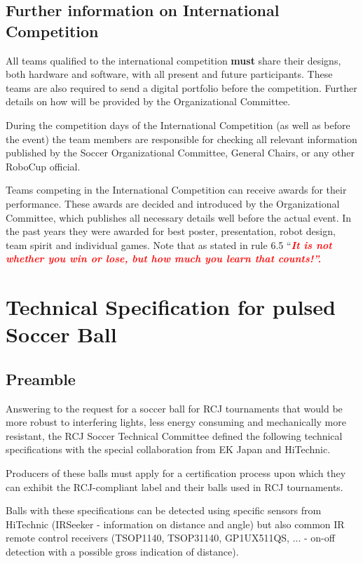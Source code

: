 \documentclass{article}
\begin{document}
\subsection{Further information on International Competition \label{ref-061}}

All teams qualified to the international competition \textbf{must} share their
designs, both hardware and software, with all present and future participants.
These teams are also required to send a digital portfolio before the
competition. Further details on how will be provided by the Organizational
Committee.

During the competition days of the International Competition (as well as before
the event) the team members are responsible for checking all relevant
information published by the Soccer Organizational Committee, General Chairs,
or any other RoboCup official.

Teams competing in the International Competition can receive awards for their
performance. These awards are decided and introduced by the Organizational
Committee, which publishes all necessary details well before the actual event.
In the past years they were awarded for best poster, presentation, robot
design, team spirit and individual games. Note that as stated in rule 6.5
``\textbf{\textit{\textcolor{red}{It is not whether you win or lose, but how
much you learn that counts!''.}}}

\appendix
\section{Technical Specification for pulsed Soccer Ball\label{ref-pulsed-spec}}

\subsection{Preamble}

Answering to the request for a soccer ball for RCJ tournaments that would be
more robust to interfering lights, less energy consuming and mechanically more
resistant, the RCJ Soccer Technical Committee defined the following technical
specifications with the special collaboration from EK Japan and HiTechnic.

Producers of these balls must apply for a certification process upon which they
can exhibit the RCJ-compliant label and their balls used in RCJ tournaments.

Balls with these specifications can be detected using specific sensors from
HiTechnic (IRSeeker - information on distance and angle) but also common IR
remote control receivers (TSOP1140, TSOP31140, GP1UX511QS, ... - on-off
detection with a possible gross indication of distance).
\end{document}
